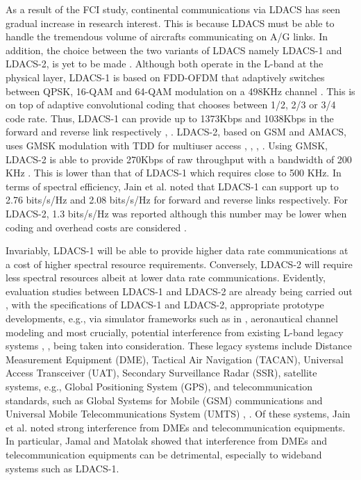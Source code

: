 As a result of the FCI study, continental communications via LDACS has seen gradual increase in research interest. This is because LDACS must be able to handle the tremendous volume of aircrafts communicating on A/G links. In addition, the choice between the two variants of LDACS namely LDACS-1 and LDACS-2, is yet to be made \cite{jain2011analysis}. Although both operate in the L-band at the physical layer, LDACS-1 is based on FDD-OFDM that adaptively switches between QPSK, 16-QAM and 64-QAM modulation on a 498KHz channel \cite{brandes2009physical}. This is on top of adaptive convolutional coding that chooses between 1/2, 2/3 or 3/4 code rate. Thus, LDACS-1 can provide up to 1373Kbps and 1038Kbps in the forward and reverse link respectively \cite{jain2011analysis}, \cite{brandes2009physical}. LDACS-2, based on GSM and AMACS, uses GMSK modulation with TDD for multiuser access \cite{neji2013survey}, \cite{fistas2009future}, \cite{jain2011analysis}, \cite{abdulkarim2013comparison}. Using GMSK, LDACS-2 is able to provide 270Kbps of raw throughput with a bandwidth of 200 KHz \cite{jain2011analysis}. This is lower than that of LDACS-1 which requires close to 500 KHz. In terms of spectral efficiency, Jain et al. \cite{jain2011analysis} noted that LDACS-1 can support up to 2.76 bits/s/Hz and 2.08 bits/s/Hz for forward and reverse links respectively. For LDACS-2, 1.3 bits/s/Hz was reported although this number may be lower when coding and overhead costs are considered \cite{jain2011analysis}.

Invariably, LDACS-1 will be able to provide higher data rate communications at a cost of higher spectral resource requirements. Conversely, LDACS-2 will require less spectral resources albeit at lower data rate communications. Evidently, evaluation studies between LDACS-1 and LDACS-2 are already being carried out \cite{neji2013survey}, with the specifications of LDACS-1 and LDACS-2, appropriate prototype developments, e.g., via simulator frameworks such as in \cite{graupl2015method}, aeronautical channel modeling and most crucially, potential interference from existing L-band legacy systems \cite{neji2013survey}, \cite{jain2011analysis}, \cite{brandes2009physical} \cite{epple2014overview} being taken into consideration. These legacy systems include Distance Measurement Equipment (DME), Tactical Air Navigation (TACAN), Universal Access Transceiver (UAT), Secondary Surveillance Radar (SSR), satellite systems, e.g., Global Positioning System (GPS), and telecommunication standards, such as Global Systems for Mobile (GSM) communications and Universal Mobile Telecommunications System (UMTS) \cite{neji2013survey}, \cite{epple2014overview}. Of these systems, Jain et al. \cite{jain2011analysis} noted strong interference from DMEs and telecommunication equipments. In particular, Jamal and Matolak \cite{jamal2017fbmc} showed that interference from DMEs and telecommunication equipments can be detrimental, especially to wideband systems such as LDACS-1. 

